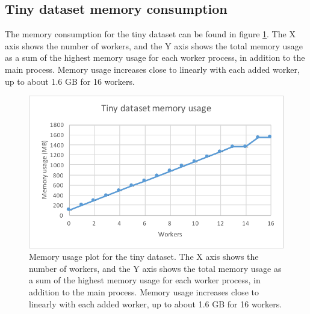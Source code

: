 \subsection{Tiny dataset memory consumption}
The memory consumption for the tiny dataset can be found in figure \ref{fig:dataset_1_memory}.
The X axis shows the number of workers, and the Y axis shows the total memory usage as
a sum of the highest memory usage for each worker process, in addition to the main process. Memory usage increases close to linearly with each added worker,
up to about 1.6 GB for 16 workers.
\begin{figure}[ht]
  \centering
  \includegraphics[width=120mm]{figures/dataset_1/dataset_1_memory.pdf}
  \caption[Memory usage plot for the tiny dataset.]{Memory usage plot for the tiny dataset. The X axis shows the number of workers, and the Y axis shows the total memory usage as
  a sum of the highest memory usage for each worker process, in addition to the main process. Memory usage increases close to linearly with each added worker,
  up to about 1.6 GB for 16 workers.}
  \label{fig:dataset_1_memory}
\end{figure}

